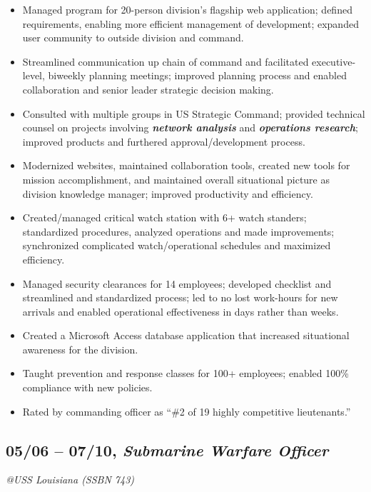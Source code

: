 \documentclass[10pt]{article}
\begin{document}
\begin{itemize}
\itemsep1pt\parskip0pt
\item
  Managed program for 20-person division's flagship web application;
  defined requirements, enabling more efficient management of
  development; expanded user community to outside division and command.
\item
  Streamlined communication up chain of command and facilitated
  executive-level, biweekly planning meetings; improved planning process
  and enabled collaboration and senior leader strategic decision making.
\item
  Consulted with multiple groups in US Strategic Command; provided
  technical counsel on projects involving \textbf{\emph{network
  analysis}} and \textbf{\emph{operations research}}; improved products
  and furthered approval/development process.
\item
  Modernized websites, maintained collaboration tools, created new tools
  for mission accomplishment, and maintained overall situational picture
  as division knowledge manager; improved productivity and efficiency.
\item
  Created/managed critical watch station with 6+ watch standers;
  standardized procedures, analyzed operations and made improvements;
  synchronized complicated watch/operational schedules and maximized
  efficiency.
\item
  Managed security clearances for 14 employees; developed checklist and
  streamlined and standardized process; led to no lost work-hours for
  new arrivals and enabled operational effectiveness in days rather than
  weeks.
\item
  Created a Microsoft Access database application that increased
  situational awareness for the division.
\item
  Taught prevention and response classes for 100+ employees; enabled
  100\% compliance with new policies.
\item
  Rated by commanding officer as ``\#2 of 19 highly competitive
  lieutenants.''
\end{itemize}

\subsection{05/06 -- 07/10, \textbf{\emph{Submarine Warfare
Officer}}}\label{submarine-warfare-officer}

\emph{@USS Louisiana (SSBN 743)}
\end{document}
